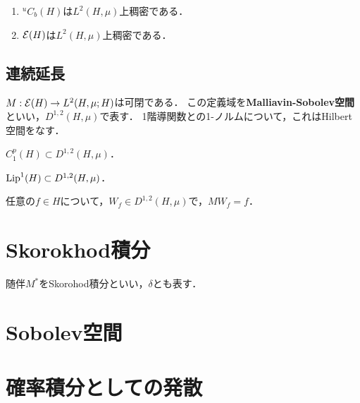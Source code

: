 \documentclass[uplatex,dvipdfmx]{jsreport}
\begin{document}
\begin{corollary}\mbox{}
    \begin{enumerate}
        \item ${}^uC_b(H)$は$L^2(H,\mu)$上稠密である．
        \item $\mathcal{E}(H)$は$L^2(H,\mu)$上稠密である．
    \end{enumerate}
\end{corollary}

\subsection{連続延長}

\begin{proposition}
    $M:\mathcal{E}(H)\to L^2(H,\mu;H)$は可閉である．
    この定義域を\textbf{Malliavin-Sobolev空間}といい，$D^{1,2}(H,\mu)$で表す．
    1階導関数との1-ノルムについて，これはHilbert空間をなす．
\end{proposition}

\begin{proposition}[$C^1$-級緩増加関数はMalliavin微分可能である]
    $C_1^p(H)\subset D^{1,2}(H,\mu)$．
\end{proposition}

\begin{proposition}[Lipschitz関数はMalliavin微分可能である]
    $\mathrm{Lip}^1(H)\subset D^{1,2}(H,\mu)$．
\end{proposition}

\begin{proposition}[微分積分学の基本定理?]
    任意の$f\in H$について，$W_f\in D^{1,2}(H,\mu)$で，$MW_f=f$．
\end{proposition}

\section{Skorokhod積分}

\begin{tcolorbox}[colframe=ForestGreen, colback=ForestGreen!10!white,breakable,colbacktitle=ForestGreen!40!white,coltitle=black,fonttitle=\bfseries\sffamily,
title=]
    随伴$M^*$をSkorohod積分といい，$\delta$とも表す．
\end{tcolorbox}

\section{Sobolev空間}

\section{確率積分としての発散}
\end{document}

